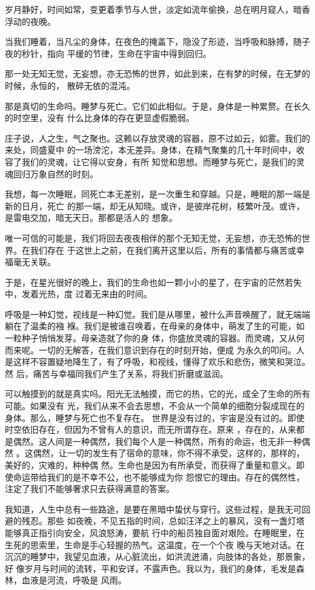 \documentclass[12pt,a4paper]{article}
\begin{document}
		岁月静好，时间如常，变更着季节与人世，淡定如流年偷换，总在明月窥人，暗香浮动的夜晚。

		当我们睡着，当凡尘的身体，在夜色的掩盖下，隐没了形迹，当呼吸和脉搏，随子夜的秒针，指向
	平缓的节律，生命在宇宙中得到回归。

		那一处无知无觉，无妄想，亦无恐怖的世界，如此到来，在有梦的时候，在无梦的时候，永恒的，
	散碎无依的混沌。


		那是真切的生命吗。睡梦与死亡。它们如此相似。于是，身体是一种累赘。在长久的时空里，没有
	什么比身体的存在更显虚假脆弱。

		庄子说，人之生，气之聚也。这赖以存放灵魂的容器，原不过如云，如雾。我们的来处，同盛夏中
	的一场滂沱，本无差异。身体，在精气聚集的几十年时间中，收容了我们的灵魂，让它得以安身，有所
	知觉和思想。而睡梦与死亡，是我们的灵魂回归万象自然的时刻。

		我想，每一次睡眠，同死亡本无差别，是一次重生和穿越。只是，睡眠的那一端是新的日月，死亡
	的那一端，却无从知晓。或许，是彼岸花树，枝繁叶茂。或许，是雷电交加，暗无天日。那都是活人的
	想象。

		唯一可信的可能是，我们将回去夜夜相伴的那个无知无觉，无妄想，亦无恐怖的世界。在我们存在
	于这世上之前，在我们离开这里以后，所有的事情都与痛苦或幸福毫无关联。


		于是，在星光很好的晚上，我们的生命也如一颗小小的星了，在宇宙的茫然若失中，发着光热，度
	过着无来由的时间。

		呼吸是一种幻觉，视线是一种幻觉。我们是从哪里，被什么声音唤醒了，就无端端躺在了温柔的襁
	褓。我们是被谁召唤着，在母亲的身体中，萌发了生的可能，如一粒种子悄悄发芽。母亲造就了你的身
	体，你盛放灵魂的容器。而灵魂，又从何而来呢。一切的无解答，在我们意识到存在的时刻开始，便成
	为永久的叩问。人是这样不容置疑地降生了，有了呼吸，和视线，懂得了欢乐和悲伤，微笑和哭泣。然
	后，痛苦与幸福同我们产生了关系，将我们折磨或滋润。


		可以触摸到的就是真实吗。阳光无法触摸，而它的热，它的光，成全了生命的所有可能。如果没有
	光，我们从来不会去思想，不会从一个简单的细胞分裂成现在的身体。那么，睡梦与死亡也不复存在。
	世界是没有过的，宇宙是没有过的。即使时空依旧存在，但因为不曾有人的意识，而无所谓存在。原来
	，存在的，从来都是偶然。这人间是一种偶然，我们每个人是一种偶然，所有的命运，也无非一种偶然
	。这偶然，让一切的发生有了宿命的意味，你不得不承受，这样的，那样的，美好的，灾难的，种种偶
	然。生命也是因为有所承受，而获得了重量和意义。即使命运带给我们的是不幸不公，也不能够成为你
	怨恨它的理由。存在的偶然性，注定了我们不能够奢求只去获得满意的答案。


		我知道，人生中总有一些路途，是要在黑暗中蛰伏与穿行。这些过程，是我无可回避的残忍。那些
	如夜晚，不见五指的时间，总如汪洋之上的暴风，没有一盏灯塔能够真正指引向安全，风浪怒涛，要航
	行中的船员独自面对艰险。在睡眠里，在生死的思索里，生命是手心轻握的热气。这温度，在一个个夜
	晚与天地对话。在沉沉的睡梦中，我望见血液，从心脏流出，如洪流迸涌，向肢体的各处，那景象，好
	像岁月与时间的流转，平和安详，不露声色。我以为，我们的身体，毛发是森林，血液是河流，呼吸是
	风雨。
\end{document}
